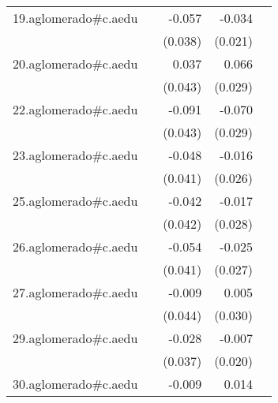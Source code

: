 {\begin{longtable}{l*{4}{D{.}{.}{-1}}}
\addlinespace
19.aglomerado#c.aedu&                     &      -0.057         &      -0.034         &                     \\
            &                     &     (0.038)         &     (0.021)         &                     \\
\addlinespace
20.aglomerado#c.aedu&                     &       0.037         &       0.066\sym{*}  &                     \\
            &                     &     (0.043)         &     (0.029)         &                     \\
\addlinespace
22.aglomerado#c.aedu&                     &      -0.091\sym{*}  &      -0.070\sym{*}  &                     \\
            &                     &     (0.043)         &     (0.029)         &                     \\
\addlinespace
23.aglomerado#c.aedu&                     &      -0.048         &      -0.016         &                     \\
            &                     &     (0.041)         &     (0.026)         &                     \\
\addlinespace
25.aglomerado#c.aedu&                     &      -0.042         &      -0.017         &                     \\
            &                     &     (0.042)         &     (0.028)         &                     \\
\addlinespace
26.aglomerado#c.aedu&                     &      -0.054         &      -0.025         &                     \\
            &                     &     (0.041)         &     (0.027)         &                     \\
\addlinespace
27.aglomerado#c.aedu&                     &      -0.009         &       0.005         &                     \\
            &                     &     (0.044)         &     (0.030)         &                     \\
\addlinespace
29.aglomerado#c.aedu&                     &      -0.028         &      -0.007         &                     \\
            &                     &     (0.037)         &     (0.020)         &                     \\
\addlinespace
30.aglomerado#c.aedu&                     &      -0.009         &       0.014         &                     \\

\end{longtable}}
